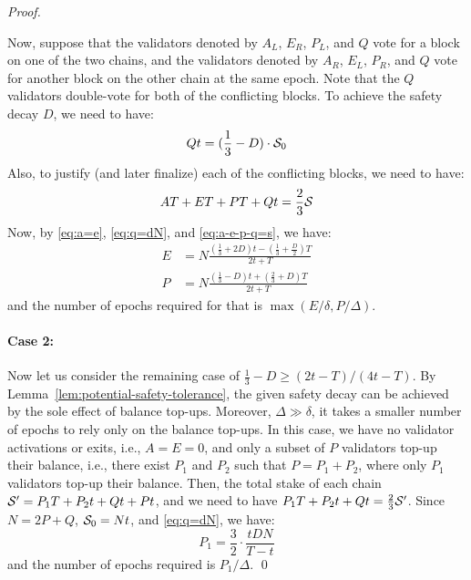 \begin{proof}
\begin{center}
\end{center}
Now, suppose that the validators denoted by $A_L$, $E_R$, $P_L$, and $Q$ vote for a block on one of the two chains, and the validators denoted by $A_R$, $E_L$, $P_R$, and $Q$ vote for another block on the other chain at the same epoch.
Note that the $Q$ validators double-vote for both of the conflicting blocks.
To achieve the safety decay $D$, we need to have:
\begin{equation}\label{eq:q=dN}
Qt = (\frac{1}{3} - D) \cdot \mathcal{S}_0
\end{equation}
Also, to justify (and later finalize) each of the conflicting blocks, we need to have:
\begin{equation}\label{eq:a-e-p-q=s}
AT + ET + PT + Qt = \frac{2}{3} \mathcal{S}
\end{equation}
Now, by \eqref{eq:a=e}, \eqref{eq:q=dN}, and \eqref{eq:a-e-p-q=s}, we have:
\begin{align*}
E & = N \frac{(\frac{1}{3} + 2D)t - (\frac{1}{3} + \frac{D}{2})T}{2t+T} \\
P & = N \frac{(\frac{1}{3} - D)t + (\frac{2}{3} + D)T}{2t+T}
\end{align*}
and the number of epochs required for that is $\max(E/\delta, P/\Delta)$.

\paragraph{Case 2:}

Now let us consider the remaining case of $\frac{1}{3} - D \ge (2t - T)/(4t - T)$.
By Lemma~\ref{lem:potential-safety-tolerance}, the given safety decay can be achieved by the sole effect of balance top-ups.
Moreover, $\Delta \gg \delta$, it takes a smaller number of epochs to rely only on the balance top-ups.
In this case, we have no validator activations or exits, i.e., $A = E = 0$, and only a subset of $P$ validators top-up their balance, i.e., there exist $P_1$ and $P_2$ such that $P = P_1 + P_2$, where only $P_1$ validators top-up their balance.
Then, the total stake of each chain $\mathcal{S}' = P_1 T + P_2 t + Qt + Pt$, and we need to have $P_1 T + P_2 t + Qt = \frac{2}{3} \mathcal{S}'$.
Since $N = 2P+Q$, $\mathcal{S}_0 = Nt$, and \eqref{eq:q=dN}, we have:
\[
P_1 = \frac{3}{2} \cdot \frac{tDN}{T-t}
\]
and the number of epochs required is $P_1 / \Delta$.
\qed
\end{proof}
